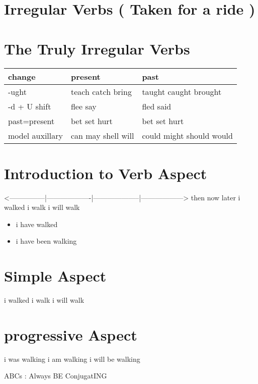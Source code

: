 \documentclass[11pt]{article}
\begin{document}
\section{Irregular Verbs ( Taken for a ride )}
\label{sec:org5415ce5}

\section{The Truly Irregular Verbs}
\label{sec:orgaeca165}
\begin{center}
\begin{tabular}{lll}
change & present & past\\
\hline
-ught & teach catch bring & taught caught brought\\
-d + U shift & flee say & fled said\\
past=present & bet set hurt & bet set hurt\\
model auxillary & can may shell will & could might should would\\
\end{tabular}
\end{center}

\section{Introduction to Verb Aspect}
\label{sec:org21b570e}
<---------------|-------------------|--------------------|------------------>
              then                  now                 later
              i walked              i walk               i will walk

\begin{itemize}
\item i have walked
\item i have been walking
\end{itemize}

\section{Simple Aspect}
\label{sec:orgf22e1d0}
i walked              i walk           i will walk

\section{progressive Aspect}
\label{sec:org3aa20a7}
i was walking            i am walking    i will be walking

ABCs : Always BE ConjugatING
\end{document}
